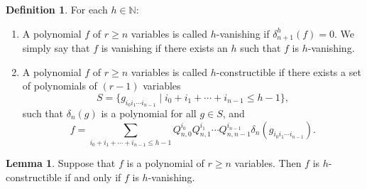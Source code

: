 \documentclass[12pt,a4paper]{report}
\theoremstyle{definition}
\newtheorem{definition}[theorem]{Definition}
\newtheorem{lemma}[theorem]{Lemma}
\theoremstyle{remark}
\theoremstyle{definition}
\begin{document}
\begin{definition}\label{def:h-vanishing}
For each $h\in \mathbb{N}$: 
\begin{enumerate}
    \item A polynomial $f$ of $r\geq n$ variables is called $h$-vanishing if $\delta_{n+1}^{h}(f) = 0$. We simply say that $f$ is vanishing if there exists an $h$ such that $f$ is $h$-vanishing.
\item A polynomial $f$ of $r\geq n$ variables is called $h$-constructible if there exists a set of polynomials of $(r-1)$ variables 
\begin{equation*}
S = \{g_{i_{0}i_{1}\cdots i_{n-1}} \mid i_0 + i_1 + \cdots + i_{n-1} \leq h-1\},    
\end{equation*}
such that $\delta_n(g)$ is a polynomial for all $g\in S$, and 
\begin{equation*}
    f = \sum\limits_{i_0 + i_1 + \cdots + i_{n-1} \leq h-1}Q_{n,0}^{i_0}Q_{n,1}^{i_1}\cdots Q_{n, n-1}^{i_{n-1}}\delta_n(g_{i_{0}i_{1}\cdots i_{n-1}}).
\end{equation*}
\end{enumerate}
\end{definition}
\begin{lemma}
    \label{lemma:general_exact}
Suppose that $f$ is a polynomial of $r\geq n$ variables. Then $f$ is $h$-constructible if and only if $f$ is $h$-vanishing.
\end{lemma}
\end{document}
